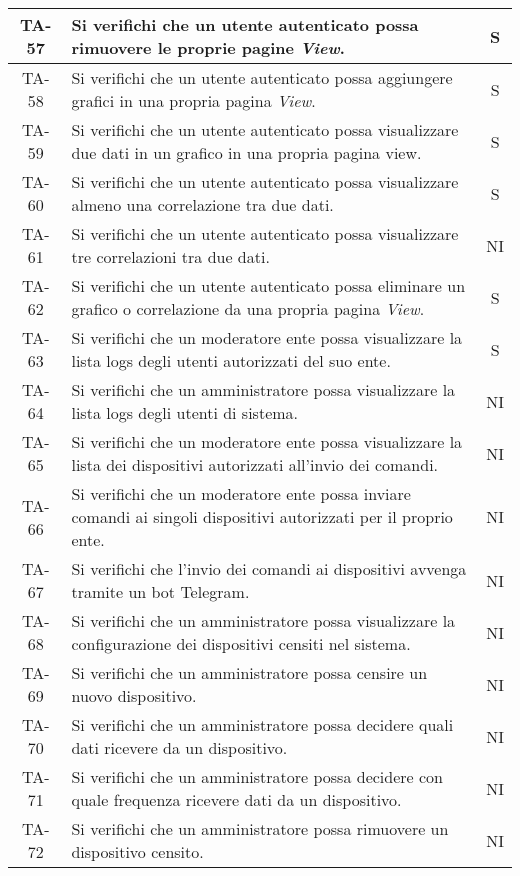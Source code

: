 \begin{center}
\begin{longtable}{|c|p{10cm}|c|}
			 \hline
			 TA-57 & Si verifichi che un utente autenticato possa rimuovere le proprie pagine \textit{View}. & S \\
			 \hline
			 TA-58 & Si verifichi che un utente autenticato possa aggiungere grafici in una propria pagina  \textit{View}. & S \\
			 \hline
			 TA-59 & Si verifichi che un utente autenticato possa visualizzare due dati in un grafico in una propria pagina view. & S \\
			 \hline
			 TA-60 & Si verifichi che un utente autenticato possa visualizzare almeno una correlazione tra due dati. & S \\
			 \hline
			 TA-61 & Si verifichi che un utente autenticato possa visualizzare tre correlazioni tra due dati. & NI \\
			 \hline
			 TA-62 & Si verifichi che un utente autenticato possa eliminare un grafico o correlazione da una propria pagina \textit{View}. & S \\
			 \hline
			 TA-63 & Si verifichi che un moderatore ente possa visualizzare la lista logs degli utenti autorizzati del suo ente. & S \\
			 \hline
			 TA-64 & Si verifichi che un amministratore possa visualizzare la lista logs degli utenti di sistema. & NI \\
			 \hline
			 TA-65 & Si verifichi che un moderatore ente possa visualizzare la lista dei dispositivi autorizzati all'invio dei comandi. & NI \\
			 \hline
			 TA-66 & Si verifichi che un moderatore ente possa inviare comandi ai singoli dispositivi autorizzati per il proprio ente. & NI \\
			 \hline
			 TA-67 & Si verifichi che l'invio dei comandi ai dispositivi avvenga tramite un bot Telegram. & NI \\
			 \hline
			 TA-68 & Si verifichi che un amministratore possa visualizzare la configurazione dei dispositivi censiti nel sistema. & NI \\
			 \hline
			 TA-69 & Si verifichi che un amministratore possa censire un nuovo dispositivo. & NI \\
			 \hline
			 TA-70 & Si verifichi che un amministratore possa decidere quali dati ricevere da un dispositivo. & NI \\
			 \hline
			 TA-71 & Si verifichi che un amministratore possa decidere con quale frequenza ricevere dati da un dispositivo. & NI \\
			 \hline
			 TA-72 & Si verifichi che un amministratore possa rimuovere un dispositivo censito. & NI \\

\end{longtable}
\end{center}
